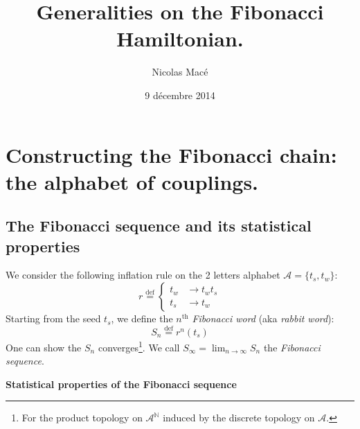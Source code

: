 \documentclass[11pt]{article}
\title{\textbf{Generalities on the Fibonacci Hamiltonian.}}
\author{Nicolas Macé}
\date{9 décembre 2014}
\newcommand{\define}{\ensuremath{ \overset{\text{def}}{=} }}
\begin{document}

\maketitle

\section{Constructing the Fibonacci chain: the alphabet of couplings.}

\subsection{The Fibonacci sequence and its statistical properties}

We consider the following inflation rule on the 2 letters alphabet $\mathcal{A} = \{t_s, t_w \}$:
\begin{equation}
	r \define \begin{cases}
        t_{w} & \rightarrow t_w t_s \\
        t_s & \rightarrow t_w
      \end{cases}
\end{equation} 
Starting from the seed $t_s$, we define the $n^\text{th}$ \emph{Fibonacci word} (aka \emph{rabbit word}):
\begin{equation}
	S_n \define r^{n}(t_s)
\end{equation}
One can show the $S_n$ converges\footnote{For the product topology on $\mathcal{A}^\mathds{N}$ induced by the discrete topology on $\mathcal{A}$.}. We call $S_\infty = \lim_{n \rightarrow \infty} S_n$ the \emph{Fibonacci sequence}.

\textbf{Statistical properties of the Fibonacci sequence}
\end{document}
